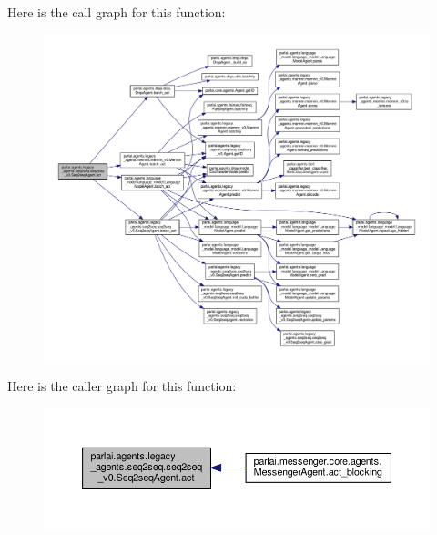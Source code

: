 Here is the call graph for this function\+:
\nopagebreak
\begin{figure}[H]
\begin{center}
\leavevmode
\includegraphics[width=350pt]{classparlai_1_1agents_1_1legacy__agents_1_1seq2seq_1_1seq2seq__v0_1_1Seq2seqAgent_ae66e8065addb136eb82828ccbe56c5ca_cgraph}
\end{center}
\end{figure}
Here is the caller graph for this function\+:
\nopagebreak
\begin{figure}[H]
\begin{center}
\leavevmode
\includegraphics[width=350pt]{classparlai_1_1agents_1_1legacy__agents_1_1seq2seq_1_1seq2seq__v0_1_1Seq2seqAgent_ae66e8065addb136eb82828ccbe56c5ca_icgraph}
\end{center}
\end{figure}
\mbox{\label{classparlai_1_1agents_1_1legacy__agents_1_1seq2seq_1_1seq2seq__v0_1_1Seq2seqAgent_ac00637641bf7d8f23614c53ec8a1c610}} 

